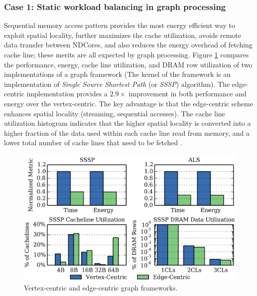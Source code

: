 \documentclass[letterpaper, 11pt, conference, margin=1in]{ieeeconf}   %
\begin{document}
\subsubsection{\bf Case 1: Static workload balancing in graph processing}
Sequential memory access pattern provides the most energy efficient way to exploit spatial locality, further maximizes the cache utilization, avoids remote data transfer between NDCores, and also reduces the energy overhead of fetching cache line; these merits are all expected by graph processing. Figure \ref{fig:graph-vertex-edge} compares the performance, energy, cache line utilization, and DRAM row utilization of two implementations of a graph framework (The kernel of the framework is an implementation of \textit{Single Source Shortest Path} (or \textit{SSSP}) algorithm). The edge-centric implementation provides a $2.9\times$ improvement in both performance and energy over the vertex-centric. The key advantage is that the edge-centric scheme enhances spatial locality (streaming, sequential accesses). The cache line utilization histogram indicates that the higher spatial locality is converted into a higher fraction of the data used within each cache line read from memory, and a lower total number of cache lines that need to be fetched \cite{Gao2015}.

\begin{figure}[h]
  \centering
  \includegraphics[scale=0.29]{figures/ndc_graph_vertex_vs_edge.png}
  \caption{Vertex-centric and edge-centric graph frameworks. \cite{Gao2015}}
  \label{fig:graph-vertex-edge}
\end{figure}
\end{document}
